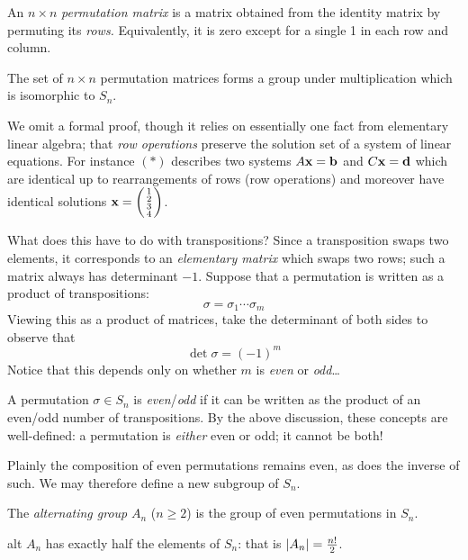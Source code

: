 \begin{defn}{}{}
An $n\times n$ \emph{permutation matrix} is a matrix obtained from the identity matrix by permuting its \emph{rows.} Equivalently, it is zero except for a single 1 in each row and column.
\end{defn}

\begin{lemm}{}{}
The set of $n\times n$ permutation matrices forms a group under multiplication which is isomorphic to $S_n$.
\end{lemm}

We omit a formal proof, though it relies on essentially one fact from elementary linear algebra; that \emph{row operations} preserve the solution set of a system of linear equations. For instance $(\ast)$ describes two systems $A{\mathbf{x}}={\mathbf{b}}$ and $C{\mathbf{x}}={\mathbf{d}}$ which are identical up to rearrangements of rows (row operations) and moreover have identical solutions ${\mathbf{x}}=\left(\begin{smallmatrix}1\\2\\3\\4\end{smallmatrix}\right)$.
\smallbreak
\goodbreak

What does this have to do with transpositions? Since a transposition swaps two elements, it corresponds to an \emph{elementary matrix} which swaps two rows; such a matrix always has determinant $-1$. Suppose that a permutation is written as a product of transpositions:
\[\sigma=\sigma_1\cdots\sigma_m\]
Viewing this as a product of matrices, take the determinant of both sides to observe that
\[\det\sigma=(-1)^m\]
Notice that this depends only on whether $m$ is \emph{even} or \emph{odd}\ldots

\begin{defn}{}{}
A permutation $\sigma\in S_n$ is \emph{even}/\emph{odd} if it can be written as the product of an even/odd number of transpositions. By the above discussion, these concepts are well-defined: a permutation is \emph{either} even or odd; it cannot be both!
\end{defn}

Plainly the composition of even permutations remains even, as does the inverse of such. We may therefore define a new subgroup of $S_n$.

\begin{defn}{}{}
The \emph{alternating group} $A_n$ ($n\ge 2$) is the group of even permutations in $S_n$.
\end{defn}

\begin{thm}{}{alt}
$A_n$ has exactly half the elements of $S_n$: that is $\left| A_n\right|=\frac{n!}{2}$.
\end{thm}

